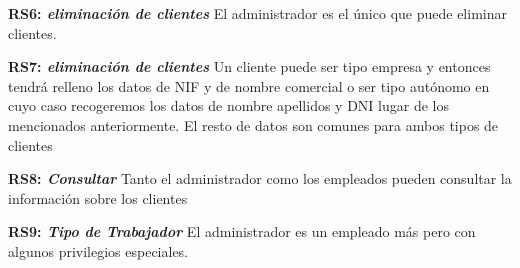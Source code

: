 \documentclass[paper=a4, fontsize=11pt, spanish]{scrartcl}
\begin{document}
\setlength{\parindent}{0em}
\textbf{RS6: \textit{eliminación de clientes}}
\setlength{\parindent}{2em}
El administrador es el único que puede eliminar clientes.

\setlength{\parindent}{0em}
\textbf{RS7: \textit{eliminación de clientes}}
\setlength{\parindent}{2em}
Un cliente puede ser tipo empresa y entonces tendrá relleno los datos de NIF y de nombre comercial o ser tipo autónomo en cuyo caso recogeremos los datos de nombre apellidos y DNI lugar de los mencionados anteriormente. El resto de datos son comunes para ambos tipos de clientes


\setlength{\parindent}{0em}
\textbf{RS8: \textit{Consultar}}
\setlength{\parindent}{2em}
Tanto el administrador como los empleados pueden consultar la información sobre los clientes


\setlength{\parindent}{0em}
\textbf{RS9: \textit{Tipo de Trabajador}}
\setlength{\parindent}{2em}
El administrador es un empleado más pero con algunos privilegios especiales.
\end{document}
